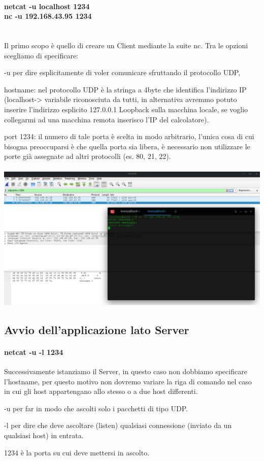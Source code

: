 \documentclass[a4paper]{article}
\begin{document}
\paragraph{netcat -u localhost 1234	
		\\ nc -u 192.168.43.95 1234 \\ \\} 
Il primo scopo è quello di creare un Client mediante la suite nc.
Tra le opzioni scegliamo di specificare:
\par -u per dire esplicitamente di voler comunicare sfruttando il protocollo UDP, 
\par hostname: nel protocollo UDP è la stringa a 4byte che identifica l’indirizzo IP (localhost-> variabile riconosciuta da tutti, in alternativa avremmo potuto inserire l’indirizzo esplicito 127.0.0.1 Loopback sulla macchina locale, se voglio collegarmi ad una macchina remota inserisco l’IP del calcolatore).
\par port 1234: il numero di tale porta è scelta in modo arbitrario, l’unica cosa di cui bisogna preoccuparsi è che quella porta sia libera, è necessario non utilizzare le porte già assegnate ad altri protocolli (es. 80, 21, 22). \\ \\
\includegraphics[width=\linewidth]{task_1/nc_client.png}

\newpage

\subsection{Avvio dell'applicazione lato Server}
\paragraph{netcat -u -l 1234 \\}
Successivamente istanziamo il Server, in questo caso non dobbiamo specificare l’hostname, per questo motivo non dovremo variare la riga di comando nel caso in cui gli host appartengano allo stesso o a due host differenti.
\par -u per far in modo che ascolti solo i pacchetti di tipo UDP.
\par -l per dire che deve ascoltare (listen) qualsiasi connessione (inviato da un qualsiasi host) in entrata.
\par 1234 è la porta su cui deve mettersi in ascolto.
\end{document}
